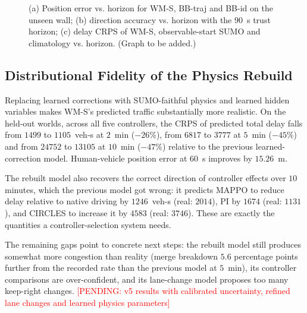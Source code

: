 \documentclass[conference]{IEEEtran}
\newcommand{\pending}[1]{\textcolor{red}{[PENDING: #1]}}
\newcommand{\graphbox}[1]{\fbox{\parbox[c][0.64in][c]{0.94\columnwidth}{\centering\textcolor{red}{[FIGURE: #1]}}}}
\begin{document}
\begin{figure}[t]
\centering
\graphbox{Zero-shot accuracy and trust horizon}
\caption{(a) Position error vs. horizon for WM-S, BB-traj and BB-id on the unseen wall; (b) direction accuracy vs. horizon with the $90$~s trust horizon; (c) delay CRPS of WM-S, observable-start SUMO and climatology vs. horizon. (Graph to be added.)} %
\label{fig:evidence}
\end{figure}

\subsection{Distributional Fidelity of the Physics Rebuild}
Replacing learned corrections with SUMO-faithful physics and learned hidden variables makes WM-S's predicted traffic substantially more realistic. On the held-out worlds, across all five controllers, the CRPS of predicted total delay falls from $1499$ to $1105$~veh-s at $2$~min ($-26\%$), from $6817$ to $3777$ at $5$~min ($-45\%$) and from $24752$ to $13105$ at $10$~min ($-47\%$) relative to the previous learned-correction model. %
Human-vehicle position error at $60$~s improves by $15.26$~m. %

The rebuilt model also recovers the correct direction of controller effects over $10$ minutes, which the previous model got wrong: it predicts MAPPO to reduce delay relative to native driving by $1246$~veh-s (real: $2014$), PI by $1674$ (real: $1131$), and CIRCLES to increase it by $4583$ (real: $3746$). %
These are exactly the quantities a controller-selection system needs.

The remaining gaps point to concrete next steps: the rebuilt model still produces somewhat more congestion than reality (merge breakdown $5.6$ percentage points further from the recorded rate than the previous model at $5$~min), its controller comparisons are over-confident, and its lane-change model proposes too many keep-right changes. %
\pending{v5 results with calibrated uncertainty, refined lane changes and learned physics parameters}
\end{document}
